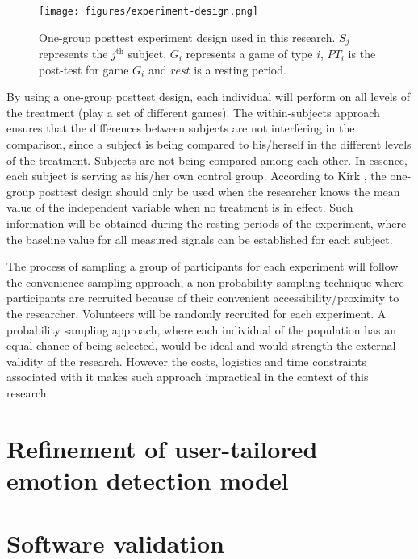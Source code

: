 \begin{figure}[ht]
    \centering
    \texttt{[image: figures/experiment-design.png]}
    \caption{One-group posttest experiment design used in this research. $S_j$ represents the $j^{\text{th}}$ subject, $G_i$ represents a game of type $i$, $PT_i$ is the post-test for game $G_i$ and $rest$ is a resting period.}
    \label{fig:experiment}
\end{figure}

By using a one-group posttest design, each individual will perform on all levels of the treatment (play a set of different games). The within-subjects approach ensures that the differences between subjects are not interfering in the comparison, since a subject is being compared to his/herself in the different levels of the treatment. Subjects are not being compared among each other. In essence, each subject is serving as his/her own control group. According to Kirk \cite{kirk1982experimental}, the one-group posttest design should only be used when the researcher knows the mean value of the independent variable when no treatment is in effect. Such information will be obtained during the resting periods of the experiment, where the baseline value for all measured signals can be established for each subject.

The process of sampling a group of participants for each experiment will follow the convenience sampling approach, a non-probability sampling technique where participants are recruited because of their convenient accessibility/proximity to the researcher. Volunteers will be randomly recruited for each experiment. A probability sampling approach, where each individual of the population has an equal chance of being selected, would be ideal and would strength the external validity of the research. However the costs, logistics and time constraints associated with it makes such approach impractical in the context of this research.

\section{Refinement of user-tailored emotion detection model}

\section{Software validation}

